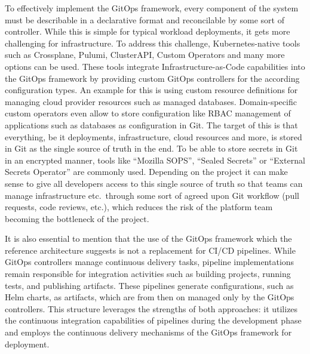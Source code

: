     To effectively implement the GitOps framework, every component of the system must be describable in a declarative format and reconcilable by some sort of controller. While this is simple for typical workload deployments, it gets more challenging for infrastructure. To address this challenge, Kubernetes-native tools such as Crossplane, Pulumi, ClusterAPI, Custom Operators and many more options can be used. These tools integrate Infrastructure-as-Code capabilities into the GitOps framework by providing custom GitOps controllers for the according configuration types. An example for this is using custom resource definitions for managing cloud provider resources such as managed databases. Domain-specific custom operators even allow to store configuration like RBAC management of applications such as databases as configuration in Git. The target of this is that everything, be it deployments, infrastructure, cloud resources and more, is stored in Git as the single source of truth in the end. To be able to store secrets in Git in an encrypted manner, tools like ``Mozilla SOPS'', ``Sealed Secrets'' or ``External Secrets Operator'' are commonly used. Depending on the project it can make sense to give all developers access to this single source of truth so that teams can manage infrastructure etc.\ through some sort of agreed upon Git workflow (pull requests, code reviews, etc.), which reduces the risk of the platform team becoming the bottleneck of the project.

    It is also essential to mention that the use of the GitOps framework which the reference architecture suggests is not a replacement for CI/CD pipelines. While GitOps controllers manage continuous delivery tasks, pipeline implementations remain responsible for integration activities such as building projects, running tests, and publishing artifacts. These pipelines generate configurations, such as Helm charts, as artifacts, which are from then on managed only by the GitOps controllers. This structure leverages the strengths of both approaches: it utilizes the continuous integration capabilities of pipelines during the development phase and employs the continuous delivery mechanisms of the GitOps framework for deployment.